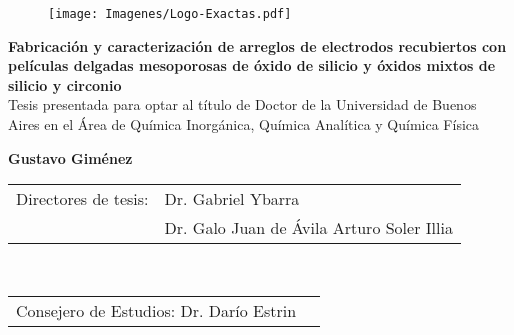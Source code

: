 \begin{titlepage}

		
		\begin{figure}[t!]
		\centering
		\texttt{[image: Imagenes/Logo-Exactas.pdf]}%
	 	\end{figure}

		\begin{center}
		\vspace*{1cm}
		\end{center}

		

	 	\begin{center}
	 	\large{\bfseries{Fabricación y caracterización de arreglos de electrodos recubiertos con películas delgadas mesoporosas de óxido de silicio y óxidos mixtos de silicio y circonio}} \\ \vspace*{0.5cm}
	 	\normalsize{Tesis presentada para optar al título de Doctor de la Universidad de Buenos Aires en el Área de Química Inorgánica, Química Analítica y Química Física} \\ \vspace*{1.2cm}
	 	
	 	\Large{\bfseries{Gustavo Giménez}} \\ 
	 	\end{center}
		
		\vspace*{2cm}

		\setlength\tabcolsep{1.5pt}
		\noindent\begin{tabular}{@{}ll}
		Directores de tesis:&Dr. Gabriel Ybarra\\  %
		 &Dr. Galo Juan de Ávila Arturo Soler Illia\\						%
		\end{tabular} \\
		\noindent\begin{tabular}{@{}ll}
		Consejero de Estudios: Dr. Darío Estrin \\ %
		\end{tabular} \\ 


\end{titlepage}
